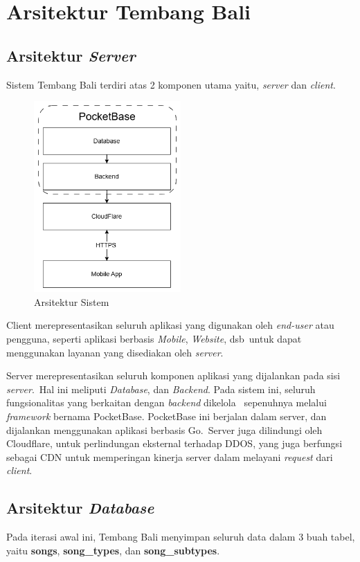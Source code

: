 \section{Arsitektur Tembang Bali}

\subsection{Arsitektur \textit{Server}}
Sistem Tembang Bali terdiri atas 2 komponen utama yaitu, \textit{server} dan \textit{client}.

\begin{figure}[H]
    \centering
    \includegraphics[width=0.5\textwidth]{assets/hla.png}
    \caption{Arsitektur Sistem}
\end{figure}

Client merepresentasikan seluruh aplikasi yang digunakan oleh \textit{end-user} atau pengguna, seperti aplikasi berbasis \textit{Mobile}, \textit{Website}, dsb\
untuk dapat menggunakan layanan yang disediakan oleh \textit{server}.

Server merepresentasikan seluruh komponen aplikasi yang dijalankan pada sisi \textit{server}.\
Hal ini meliputi \textit{Database}, dan \textit{Backend}. Pada sistem ini, seluruh fungsionalitas yang berkaitan dengan \textit{backend} dikelola \
sepenuhnya melalui \textit{framework} bernama PocketBase. PocketBase ini berjalan dalam server, dan dijalankan menggunakan aplikasi berbasis Go.\
Server juga dilindungi oleh Cloudflare, untuk perlindungan eksternal terhadap DDOS, yang juga berfungsi sebagai CDN untuk memperingan kinerja server dalam melayani \textit{request} dari \textit{client}.

\subsection{Arsitektur \textit{Database}}
Pada iterasi awal ini, Tembang Bali menyimpan seluruh data dalam 3 buah tabel, yaitu \textbf{songs}, \textbf{song\_types}, dan \textbf{song\_subtypes}.

